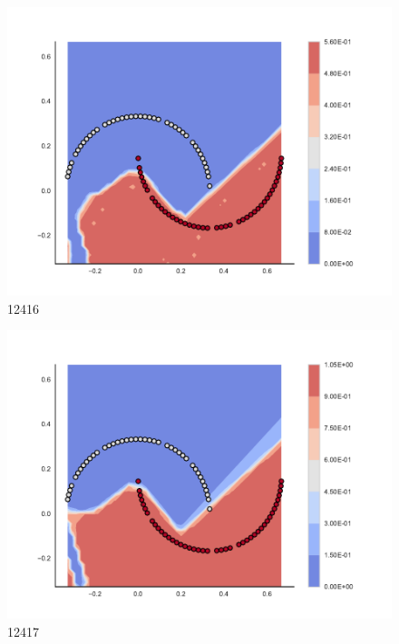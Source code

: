 \begin{subfigure}[b]{0.09\textwidth}
    \includegraphics[clip, trim=2.35cm 1.75cm 4.5cm 0cm,width=\textwidth]{img/convergence/12416.pdf}
    \caption{12416}
    \label{fig:convergence_12416}
\end{subfigure}
%
\begin{subfigure}[b]{0.09\textwidth}
    \includegraphics[clip, trim=2.35cm 1.75cm 4.5cm 0cm,width=\textwidth]{img/convergence/12417.pdf}
    \caption{12417}
    \label{fig:convergence_12417}
\end{subfigure}
%
